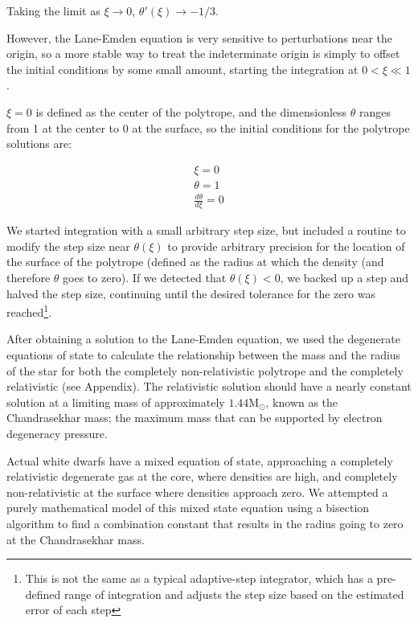 \documentclass[twoside]{article}
\begin{document}
\begin{multicols}{2}
Taking the limit as \(\xi\rightarrow 0\), \(\theta'(\xi)\rightarrow -1/3\).

However, the Lane-Emden equation is very sensitive to perturbations near the
origin\cite[p.340]{hansen2004}, so a more stable way to treat the indeterminate
origin is simply to offset the initial conditions by some small amount, starting
the integration at \(0 < \xi \ll 1\).

\(\xi=0\) is defined as the center of the polytrope, and the dimensionless
\(\theta\) ranges from 1 at the center to 0 at the surface, so the initial
conditions for the polytrope solutions are:

\[
    \begin{array}{l}
        \xi = 0 \\
        \theta = 1 \\
        \frac{d\theta}{d\xi} = 0
    \end{array}
\]

We started integration with a small arbitrary step size, but included a routine
to modify the step size near \(\theta(\xi)\) to provide arbitrary precision for
the location of the surface of the polytrope (defined as the radius at which the
density (and therefore \(\theta\) goes to zero). If we detected that
\(\theta(\xi) < 0\), we backed up a step and halved the step size, continuing
until the desired tolerance for the zero was reached\footnote{This is not the
same as a typical adaptive-step integrator, which has a pre-defined range of
integration and adjusts the step size based on the estimated error of each
step}.

After obtaining a solution to the Lane-Emden equation, we used the degenerate
equations of state to calculate the relationship between the mass and the radius
of the star for both the completely non-relativistic polytrope and the
completely relativistic (see Appendix). The relativistic solution should have a
nearly constant solution at a limiting mass of approximately
\(1.44\mathrm{M}_{\odot}\), known as the Chandrasekhar mass; the maximum mass
that can be supported by electron degeneracy pressure.

Actual white dwarfs have a mixed equation of state, approaching a completely
relativistic degenerate gas at the core, where densities are high, and
completely non-relativistic at the surface where densities approach zero. We
attempted a purely mathematical model of this mixed state equation using a
bisection algorithm to find a combination constant that results in the radius
going to zero at the Chandrasekhar mass.


\end{multicols}
\end{document}
